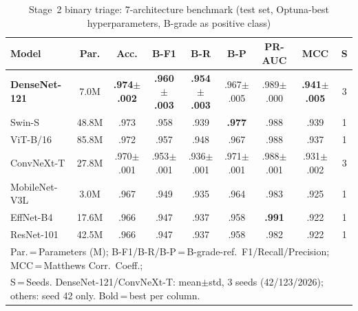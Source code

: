 \documentclass[conference]{IEEEtran}
\begin{document}
\begin{table}[t]
  \caption{Stage~2 binary triage: 7-architecture benchmark (test set, Optuna-best hyperparameters, B-grade as positive class)}
  \label{tab:stage2_results}
  \centering
  \renewcommand{\arraystretch}{0.95}\scriptsize
  \setlength{\tabcolsep}{4.2pt}
  \begin{tabular}{l c c c c c c c c}
    \toprule
    \textbf{Model} & \textbf{Par.} & \textbf{Acc.} & \textbf{B-F1} & \textbf{B-R} & \textbf{B-P} & \textbf{PR-AUC} & \textbf{MCC} & \textbf{S}\\
    \midrule
    \textbf{DenseNet-121} & 7.0M & \textbf{.974$\pm$.002} & \textbf{.960$\pm$.003} & \textbf{.954$\pm$.003} & .967$\pm$.005 & .989$\pm$.000 & \textbf{.941$\pm$.005} & 3\\
    Swin-S        & 48.8M & .973 & .958 & .939 & \textbf{.977} & .988 & .939 & 1\\
    ViT-B/16      & 85.8M & .972 & .957 & .948 & .967 & .988 & .937 & 1\\
    ConvNeXt-T    & 27.8M & .970$\pm$.001 & .953$\pm$.001 & .936$\pm$.001 & .971$\pm$.001 & .988$\pm$.001 & .931$\pm$.002 & 3\\
    MobileNet-V3L & 3.0M & .967 & .949 & .935 & .964 & .983 & .925 & 1\\
    EffNet-B4     & 17.6M & .966 & .947 & .937 & .958 & \textbf{.991} & .922 & 1\\
    ResNet-101    & 42.5M & .966 & .947 & .937 & .958 & .982 & .922 & 1\\
    \bottomrule
    \multicolumn{9}{l}{\footnotesize Par.\,=\,Parameters (M); B-F1/B-R/B-P\,=\,B-grade-ref.\ F1/Recall/Precision; MCC\,=\,Matthews Corr.\ Coeff.;}\\
    \multicolumn{9}{l}{\footnotesize S\,=\,Seeds. DenseNet-121/ConvNeXt-T: mean$\pm$std, 3 seeds (42/123/2026); others: seed 42 only. Bold\,=\,best per column.}
  \end{tabular}
\end{table}
\end{document}
